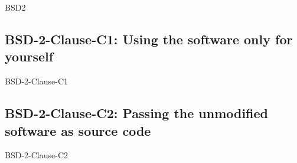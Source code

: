 
\begin{license}{BSD2}


\subsection{BSD-2-Clause-C1: Using the software only for yourself}
\begin{lsuc}{BSD-2-Clause-C1}
  
  \lsucmeans{\useCaseOne} 
  \lsuccovers{\coversOne}

  \begin{lsucrequiresnothing}
  \end{lsucrequiresnothing}

  \lsucprohibitsnothing
\end{lsuc}

\subsection{BSD-2-Clause-C2: Passing the unmodified software as source code}
\begin{lsuc}{BSD-2-Clause-C2}

  \lsucmeans{\useCaseTwo}
  \lsuccovers{\coversTwo}

  \begin{lsucrequires}
    \lsucmandatory{\keepLicenseElements}
  \end{lsucrequires}

  \lsucprohibitsnothing
\end{lsuc}


\end{license}
